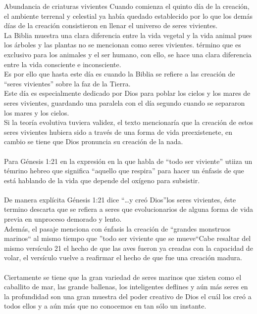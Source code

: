 \begin{section}{Abundancia de criaturas vivientes}
Cuando comienza el quinto día de la creación, el ambiente terrenal y celestial ya había quedado establecido por lo que los demás días de la creación consistieron en llenar el universo de seres vivientes.\\
La Biblia muestra una clara diferencia entre la vida vegetal y la vida animal pues los árboles y las plantas no se mencionan como seres vivientes. término que es exclusivo para los animales y el ser humano, con ello, se hace una clara diferencia entre la vida consciente e inconsciente.\\
Es por ello que hasta este día es cuando la Biblia se refiere a las creación de ``seres vivientes'' sobre la faz de la Tierra.\\
Este día es especialmente dedicado por Dios para poblar los cielos y los mares de seres vivientes, guardando una paralela con el día segundo cuando se separaron los mares y los cielos.\\
Si la teoría evolutiva tuviera validez, el texto mencionaría que la creación de estos seres vivientes hubiera sido a través de una forma de vida preexistenete, en cambio se tiene que Dios pronuncia su creación de la nada.\\
\\
Para Génesis 1:21 en la expresión en la que habla de ``todo ser viviente'' utiiza un témrino hebreo que significa ``aquello que respira'' para hacer un énfasis de que está hablando de la vida que depende del oxígeno para subsistir.\\
\\
De manera explícita Génesis 1:21 dice ``\ldots y creó Dios''los seres vivientes, éste termino descarta que se refiera a seres que evolucionarios de alguna forma de vida previa en unproceso demorado y lento.\\
Además, el pasaje menciona con énfasis la creación de ``grandes monstruos marinos`` al mismo tiempo que ''todo ser viviente que se mueve``Cabe resaltar del mismo versículo 21 el hecho de que las aves fueron ya creadas con la capacidad de volar, el versículo vuelve a reafirmar el hecho de que fue una creación madura.\\
\\
Ciertamente se tiene que la gran variedad de seres marinos que xisten como el caballito de mar, las grande ballenas, los inteligentes deflines y aún más seres en la profundidad son una gran muestra del poder creativo de Dios el cuál los creó a todos ellos y a aún más que no conocemos en tan sólo un instante.\\

\end{section}
